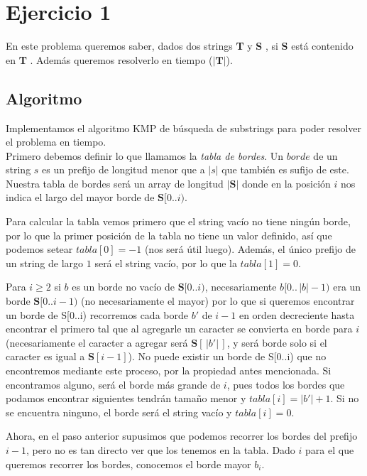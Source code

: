 \section{Ejercicio 1}

\newcommand\sS{ \textbf{S} }
\newcommand\sT{ \textbf{T} }

En este problema queremos saber, dados dos strings \sT y \sS, si \sS está contenido en \sT. Además queremos resolverlo en tiempo \bigo($|\sT|$).

\subsection{Algoritmo}

Implementamos el algoritmo KMP de búsqueda de substrings para poder resolver el problema en tiempo.
\\

Primero debemos definir lo que llamamos la \textit{tabla de bordes}. Un $borde$ de un string $s$ es un prefijo de longitud menor que a $|s|$ que también es sufijo de este. Nuestra tabla de bordes será un array de longitud $|\sS|$ donde en la posición $i$ nos indica el largo del mayor borde de $\sS[0..i)$.

    Para calcular la tabla vemos primero que el string vacío no tiene ningún borde, por lo que la primer posición de la tabla no tiene un valor definido, así que podemos setear $tabla[0] = -1$ (nos será útil luego). Además, el único prefijo de un string de largo $1$ será el string vacío, por lo que la $tabla[1] = 0$.

Para $i \geq 2$ si $b$ es un borde no vacío de $\sS[0..i)$, necesariamente $b[0.. \,|b|-1)$ era un borde $\sS[0..i-1)$ (no necesariamente el mayor) por lo que si queremos encontrar un borde de S[0..i) recorremos cada borde $b'$ de $i-1$ en orden decreciente hasta encontrar el primero tal que al agregarle un caracter se convierta en borde para $i$ (necesariamente el caracter a agregar será $\sS[ \,|b'|\, ]$, y será borde solo si el caracter es igual a $\sS[i-1]$).
No puede existir un borde de S[0..i) que no encontremos mediante este proceso, por la propiedad antes mencionada.
Si encontramos alguno, será el borde más grande de $i$, pues todos los bordes que podamos encontrar siguientes tendrán tamaño menor y $tabla[i] = |b'| + 1$. Si no se encuentra ninguno, el borde será el string vacío y $tabla[i] = 0$.

Ahora, en el paso anterior supusimos que podemos recorrer los bordes del prefijo $i-1$, pero no es tan directo ver que los tenemos en la tabla. Dado $i$ para el que queremos recorrer los bordes, conocemos el borde mayor $b_i$.

